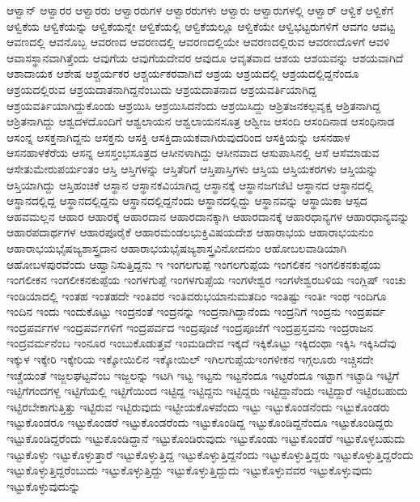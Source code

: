 {ಆಳ್ವಾನ್
ಆಳ್ವಾರರ
ಆಳ್ವಾರರು
ಆಳ್ವಾರರುಗಳ
ಆಳ್ವಾರರುಗಳು
ಆಳ್ವಾರು
ಆಳ್ವಾರುಗಳಲ್ಲಿ
ಆಳ್ವಾರ್
ಆಳ್ವಿಕೆ
ಆಳ್ವಿಕೆಗೆ
ಆಳ್ವಿಕೆಯ
ಆಳ್ವಿಕೆಯನ್ನು
ಆಳ್ವಿಕೆಯನ್ನೇ
ಆಳ್ವಿಕೆಯಲ್ಲಿ
ಆಳ್ವಿಕೆಯಲ್ಲೂ
ಆಳ್ವಿಕೆಯೇ
ಆಳ್ವಿಭಟ್ಟರುಗಳಿಗೆ
ಆವಗಂ
ಆವಟ್ಟ
ಆವಣದಲ್ಲಿ
ಆವನೊಬ್ಬ
ಆವರಣದ
ಆವರಣದಲ್ಲಿ
ಆವರಣದಲ್ಲಿಯೇ
ಆವರಣದಲ್ಲಿರುವ
ಆವರಣದೊಳಗೆ
ಆವಳಿ
ಆವಾಸಸ್ಥಾನವಾಗಿತ್ತೆಂದು
ಆವುಗೆಯ
ಆವುಗೆಯದೇವರ
ಆವುದೂ
ಆವೃತವಾದ
ಆಶಯ
ಆಶಯವನ್ನು
ಆಶಯವಾಗಿದೆ
ಆಶಾದಾಯಕ
ಆಶೇಷ
ಆಶ್ಚರ್ಯಕರ
ಆಶ್ಚರ್ಯಕರವಾಗಿದೆ
ಆಶ್ರಯ
ಆಶ್ರಯದಲ್ಲಿ
ಆಶ್ರಯದಲ್ಲಿದ್ದನೆಂದೂ
ಆಶ್ರಯದಲ್ಲಿರುವ
ಆಶ್ರಯದಾತನಾಗಿದ್ದನೆಂಬುದು
ಆಶ್ರಯದಾತನಾದ
ಆಶ್ರಯವರ್ತಿಯಾಗಿದ್ದ
ಆಶ್ರಯವರ್ತಿಯಾಗಿದ್ದುಕೊಂಡು
ಆಶ್ರಯಿಸಿ
ಆಶ್ರಯಿಸಿದನೆಂದು
ಆಶ್ರಯಿಸಿದ್ದು
ಆಶ್ರಿತಜನಕಲ್ಪವೃಕ್ಷ
ಆಶ್ರಿತನಾಗಿದ್ದ
ಆಶ್ರಿತನಾಗಿದ್ದು
ಆಶ್ವದಳದೊಂದಿಗೆ
ಆಶ್ವಲಾಯನ
ಆಶ್ವಲಾಯನಸೂತ್ರ
ಆಶ್ವೀಜ
ಆಸಂದಿ
ಆಸಂದಿನಾಡ
ಆಸಂಧಿನಾಡ
ಆಸಂನ್ನ
ಆಸಕ್ತನಾಗಿದ್ದನು
ಆಸಕ್ತನು
ಆಸಕ್ತಿ
ಆಸಕ್ತಿದಾಯಕವಾಗಿರುವುದರಿಂದ
ಆಸಕ್ತಿಯನ್ನು
ಆಸನಹಾಳ
ಆಸನಹಾಳಕೆರೆಯ
ಆಸನ್ನ
ಆಸಸ್ತಂಭಸೂತ್ರದ
ಆಸೀನಳಾಗಿದ್ದು
ಆಸೀನವಾದ
ಆಸುಪಾಸಿನಲ್ಲಿ
ಆಸೆ
ಆಸೆಮಾಡುವ
ಆಸೇತುಮೇರುಪರ್ಯಂತಂ
ಆಸ್ತಿ
ಆಸ್ತಿಗಳನ್ನು
ಆಸ್ತಿತೆರಿಗೆ
ಆಸ್ತಿಪಾಸ್ತಿಗಳು
ಆಸ್ತಿಯ
ಆಸ್ತಿಯಕರಗಳು
ಆಸ್ತಿಯನ್ನು
ಆಸ್ತಿಯಾಗಿದ್ದು
ಆಸ್ತಿಹಂಚಿಕೆ
ಆಸ್ಥಾನ
ಆಸ್ಥಾನಕವಿಯಾಗಿದ್ದ
ಆಸ್ಥಾನಕ್ಕೆ
ಆಸ್ಥಾನಜಗಜೆಟಿ
ಆಸ್ಥಾನದ
ಆಸ್ಥಾನದಲ್ಲಿ
ಆಸ್ಥಾನದಲ್ಲಿದ್ದ
ಆಸ್ಥಾನದಲ್ಲಿದ್ದನು
ಆಸ್ಥಾನದಲ್ಲಿದ್ದನೆಂದು
ಆಸ್ಥಾನದಲ್ಲಿದ್ದು
ಆಸ್ಥಾನವನ್ನು
ಆಸ್ಥಾಯಿಕಾ
ಆಸ್ಪದ
ಆಹವಮಲ್ಲನ
ಆಹಾರ
ಆಹಾರಕ್ಕೆ
ಆಹಾರದಾನ
ಆಹಾರದಾನಕ್ಕಾಗಿ
ಆಹಾರದಾನಕ್ಕೆ
ಆಹಾರಧಾನ್ಯಗಳ
ಆಹಾರಧಾನ್ಯವನ್ನು
ಆಹಾರಪದಾರ್ಥಗಳ
ಆಹಾರಪೂರೈಕೆ
ಆಹಾರಮಂಡಲಭುಕ್ತಿವಿಷಯದೇಶ
ಆಹಾರಾಭಯ
ಆಹಾರಾಭಯನುಂ
ಆಹಾರಾಭಯಭೈಷಜ್ಯಶಾಸ್ತ್ರದಾನ
ಆಹಾರಾಭಯಭೈಷಜ್ಯಶಾಸ್ತ್ರವಿನೋದನುಂ
ಆಹೋಬಲವಾಡಿಯಾಗಿ
ಆಹೋಬಳಪುರವೆಂದು
ಆಹ್ವಾನಿಸುತ್ತಿದ್ದನು
ಇ
ಇಂಗಲಗುಪ್ಪೆ
ಇಂಗಲಗುಪ್ಪೆಯ
ಇಂಗಲಿಕನ
ಇಂಗಲಿಕನಕುಪ್ಪೆಯ
ಇಂಗಲೀಕನ
ಇಂಗಲೀಕನಕುಪ್ಪೆಯ
ಇಂಗಳಗುಪ್ಪೆ
ಇಂಗಳಗುಪ್ಪೆಯ
ಇಂಗಳೇಶ್ವರ
ಇಂಗಳೇಶ್ವರಬಳಿಯ
ಇಂಗ್ಲಿಷ್
ಇಂಚು
ಇಂಡಿಯಾದಲ್ಲಿ
ಇಂತಹ
ಇಂತಹದೇ
ಇಂತಿವರ
ಇಂತಿವರುಭಯಾನುಮತದಿಂ
ಇಂತಿಷ್ಟು
ಇಂತೀ
ಇಂಥ
ಇಂದಿಗೂ
ಇಂದಿನ
ಇಂದು
ಇಂದುಕೊಟ್ಟು
ಇಂದ್ರನಂತೆ
ಇಂದ್ರನನ್ನು
ಇಂದ್ರನಾಗಿದ್ದಾನೆಂದು
ಇಂದ್ರನಿಗೆ
ಇಂದ್ರನು
ಇಂದ್ರಪರ್ವ
ಇಂದ್ರಪರ್ವಗಳ
ಇಂದ್ರಪರ್ವಗಳಿಗೆ
ಇಂದ್ರಪರ್ವದ
ಇಂದ್ರಪೂಜೆ
ಇಂದ್ರಪೂಜೆಗೆ
ಇಂದ್ರಪ್ರಸ್ತವನು
ಇಂದ್ರರಾಜನ
ಇಂದ್ರವರ್ಮನೆಂಬ
ಇಂನೂರ
ಇಂಬುಕೊಡುತ್ತವೆ
ಇಂಮಡಿದೇವ
ಇಕ್ಕದೆ
ಇಕ್ಕಿಕೊಟ್ಟು
ಇಕ್ಕಿದಂಥಾ
ಇಕ್ಕಿಸಿ
ಇಕ್ಕಿಸಿದೆವು
ಇಕ್ಕುಳ
ಇಕ್ಕೇರಿ
ಇಕ್ಕೇರಿಯ
ಇಕ್ಕೋಯಿಲಿನ
ಇಕ್ಕೋಯಿಲ್
ಇಗಿಲಗುಪ್ಪೆಯಇಂಗಳೀಕನ
ಇಗ್ಗಲೂರು
ಇಚ್ಚಿಸದೇ
ಇಚ್ಚೆಯಂತೆ
ಇಜ್ಜಲಘಟ್ಟವೆಂಬ
ಇಜ್ಜಲನ್ನು
ಇಟಗಿ
ಇಟ್ಟ
ಇಟ್ಟನು
ಇಟ್ಟನೆಂದೂ
ಇಟ್ಟರೆಂದೂ
ಇಟ್ಟಾಗ
ಇಟ್ಟಾಡಿ
ಇಟ್ಟಿಗೆ
ಇಟ್ಟಿಗೆಗಂದಗಳ್ದ
ಇಟ್ಟಿಗೆಯಲ್ಲಿ
ಇಟ್ಟಿಗೆಯಿಂದ
ಇಟ್ಟಿದ್ದ
ಇಟ್ಟಿದ್ದನು
ಇಟ್ಟಿದ್ದರು
ಇಟ್ಟಿದ್ದಾನೆಂದು
ಇಟ್ಟಿದ್ದಾರೆ
ಇಟ್ಟಿರಬಹುದು
ಇಟ್ಟಿರಬೇಕಾಗುತ್ತಿತ್ತು
ಇಟ್ಟಿರುವ
ಇಟ್ಟಿರುವುದು
ಇಟ್ಟೀಯಕೊಳವೆಂದು
ಇಟ್ಟು
ಇಟ್ಟುಕೊಂಡನೆಂದು
ಇಟ್ಟುಕೊಂಡರು
ಇಟ್ಟುಕೊಂಡರೂ
ಇಟ್ಟುಕೊಂಡರೆ
ಇಟ್ಟುಕೊಂಡರೆಂದು
ಇಟ್ಟುಕೊಂಡಿದ್ದ
ಇಟ್ಟುಕೊಂಡಿದ್ದನೆಂದೂ
ಇಟ್ಟುಕೊಂಡಿದ್ದರು
ಇಟ್ಟುಕೊಂಡಿದ್ದರೆಂದು
ಇಟ್ಟುಕೊಂಡಿದ್ದಾನೆ
ಇಟ್ಟುಕೊಂಡಿರುವುದು
ಇಟ್ಟುಕೊಂಡು
ಇಟ್ಟುಕೊಂಡೆರೆ
ಇಟ್ಟುಕೊಳ್ಳಬಹುದು
ಇಟ್ಟುಕೊಳ್ಳು
ಇಟ್ಟುಕೊಳ್ಳುತ್ತಾರೆ
ಇಟ್ಟುಕೊಳ್ಳುತ್ತಿದ್ದ
ಇಟ್ಟುಕೊಳ್ಳುತ್ತಿದ್ದನೆಂದು
ಇಟ್ಟುಕೊಳ್ಳುತ್ತಿದ್ದರು
ಇಟ್ಟುಕೊಳ್ಳುತ್ತಿದ್ದರೆಂದು
ಇಟ್ಟುಕೊಳ್ಳುತ್ತಿದ್ದರೆಂಬುದು
ಇಟ್ಟುಕೊಳ್ಳುತ್ತಿದ್ದು
ಇಟ್ಟುಕೊಳ್ಳುತ್ತಿದ್ದುದು
ಇಟ್ಟುಕೊಳ್ಳುವವರ
ಇಟ್ಟುಕೊಳ್ಳುವುದು
ಇಟ್ಟುಕೊಳ್ಳುವುದುನ್ನು
}
